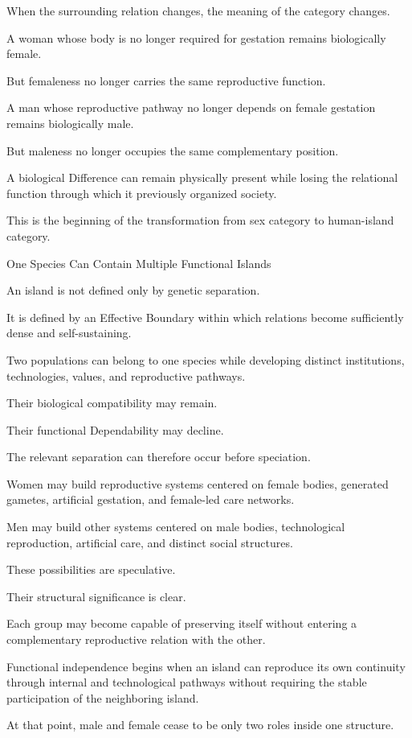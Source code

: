 When the surrounding relation changes, the meaning of the category changes.

A woman whose body is no longer required for gestation remains biologically female.

But femaleness no longer carries the same reproductive function.

A man whose reproductive pathway no longer depends on female gestation remains biologically male.

But maleness no longer occupies the same complementary position.

A biological Difference can remain physically present while losing the relational function through which it previously organized society.

This is the beginning of the transformation from sex category to human-island category.

One Species Can Contain Multiple Functional Islands

An island is not defined only by genetic separation.

It is defined by an Effective Boundary within which relations become sufficiently dense and self-sustaining.

Two populations can belong to one species while developing distinct institutions, technologies, values, and reproductive pathways.

Their biological compatibility may remain.

Their functional Dependability may decline.

The relevant separation can therefore occur before speciation.

Women may build reproductive systems centered on female bodies, generated gametes, artificial gestation, and female-led care networks.

Men may build other systems centered on male bodies, technological reproduction, artificial care, and distinct social structures.

These possibilities are speculative.

Their structural significance is clear.

Each group may become capable of preserving itself without entering a complementary reproductive relation with the other.

Functional independence begins when an island can reproduce its own continuity through internal and technological pathways without requiring the stable participation of the neighboring island.

At that point, male and female cease to be only two roles inside one structure.

